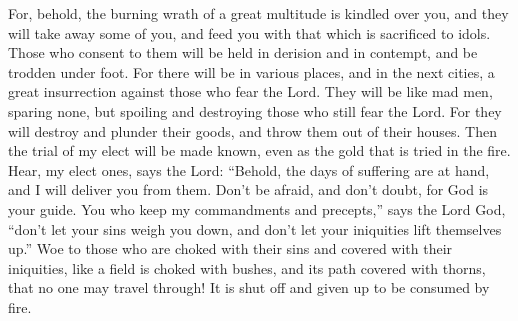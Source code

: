  For, behold, the burning wrath of a great multitude is
kindled over you, and they will take away some of you, and feed you with
that which is sacrificed to idols.  Those who consent to
them will be held in derision and in contempt, and be trodden under
foot.  For there will be in various places, and in the next
cities, a great insurrection against those who fear the Lord.
 They will be like mad men, sparing none, but spoiling and
destroying those who still fear the Lord.  For they will
destroy and plunder their goods, and throw them out of their houses.
 Then the trial of my elect will be made known, even as the
gold that is tried in the fire.  Hear, my elect ones, says
the Lord: ``Behold, the days of suffering are at hand, and I will
deliver you from them.  Don't be afraid, and don't doubt,
for God is your guide.  You who keep my commandments and
precepts,'' says the Lord God, ``don't let your sins weigh you down, and
don't let your iniquities lift themselves up.''  Woe to
those who are choked with their sins and covered with their iniquities,
like a field is choked with bushes, and its path covered with thorns,
that no one may travel through!  It is shut off and given
up to be consumed by fire.
